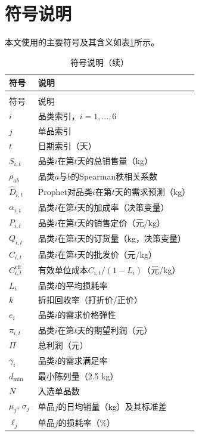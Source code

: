 
\section{符号说明}

本文使用的主要符号及其含义如表\ref{tab:符号说明}所示。

\begin{longtable}{>{\centering\arraybackslash}p{}>{\centering\arraybackslash}p{}}
  \caption{符号说明}
  \label{tab:符号说明} \\
  \toprule
  符号 & 说明 \\
  \midrule
  \endfirsthead
  \caption{符号说明（续）} \\
  \toprule
  符号 & 说明 \\
  \midrule
  \endhead
  \bottomrule
  \endfoot
  $i$ & 品类索引，$i=1,\ldots,6$ \\
  $j$ & 单品索引 \\
  $t$ & 日期索引（天） \\
  $S_{i,t}$ & 品类$i$在第$t$天的总销售量（kg） \\
  $\rho_{ab}$ & 品类$a$与$b$的Spearman秩相关系数 \\
  $\hat{D}_{i,t}$ & Prophet对品类$i$在第$t$天的需求预测（kg） \\
  $\alpha_{i,t}$ & 品类$i$在第$t$天的加成率（决策变量） \\
  $P_{i,t}$ & 品类$i$在第$t$天的销售定价（元/kg） \\
  $Q_{i,t}$ & 品类$i$在第$t$天的订货量（kg，决策变量） \\
  $C_{i,t}$ & 品类$i$在第$t$天的批发价（元/kg） \\
  $C_{i,t}^{\text{eff}}$ & 有效单位成本$C_{i,t}/(1-L_i)$（元/kg） \\
  $L_i$ & 品类$i$的平均损耗率 \\
  $k$ & 折扣回收率（打折价/正价） \\
  $e_i$ & 品类$i$的需求价格弹性 \\
  $\pi_{i,t}$ & 品类$i$在第$t$天的期望利润（元） \\
  $\Pi$ & 总利润（元） \\
  $\gamma_i$ & 品类$i$的需求满足率 \\
  $d_{\min}$ & 最小陈列量（2.5 kg） \\
  $N$ & 入选单品数 \\
  $\mu_j$, $\sigma_j$ & 单品$j$的日均销量（kg）及其标准差 \\
  $\ell_j$ & 单品$j$的损耗率（\%） \\
\end{longtable}
